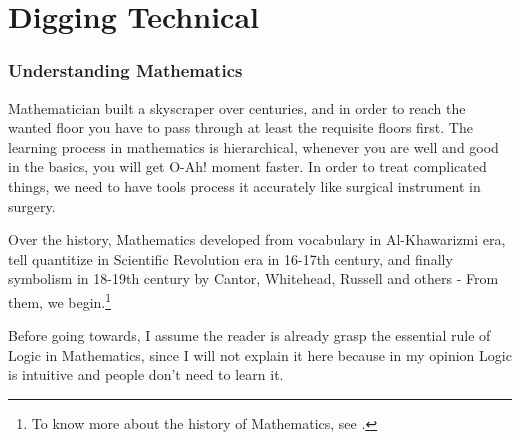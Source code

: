 \part{Digging Technical}

\section{Understanding Mathematics}
Mathematician built a skyscraper over centuries, and in order to reach the wanted floor you have to pass through at least the requisite floors first. The learning process in mathematics is hierarchical, whenever you are well and good in the basics, you will get O-Ah! moment faster. In order to treat complicated things, we need to have tools process it accurately like surgical instrument in surgery. 

Over the history, Mathematics developed from vocabulary in Al-Khawarizmi era,  tell quantitize in Scientific Revolution era in 16-17th century, and finally symbolism in 18-19th century by Cantor, Whitehead, Russell and others - From them, we begin.\footnote{To know more about the history of Mathematics, see \cite{krantz2010an}.}

Before going towards, I assume the reader is already grasp the essential rule of Logic in Mathematics, since I will not explain it here because in my opinion Logic is intuitive and people don't need to learn it.